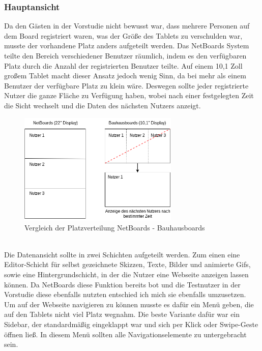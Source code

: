 \subsubsection{Hauptansicht}\label{Hauptansicht}
Da den Gästen in der Vorstudie nicht bewusst war, dass mehrere Personen auf dem Board registriert waren, was der Größe des Tablets zu verschulden war, musste der vorhandene Platz anders aufgeteilt werden. Das NetBoards System teilte den Bereich verschiedener Benutzer räumlich, indem es den verfügbaren Platz durch die Anzahl der registrierten Benutzer teilte.
Auf einem 10,1 Zoll großem Tablet macht dieser Ansatz jedoch wenig Sinn, da bei mehr als einem Benutzer der verfügbare Platz zu klein wäre.
Deswegen sollte jeder registrierte Nutzer die ganze Fläche zu Verfügung haben, wobei nach einer festgelegten Zeit die Sicht wechselt und die Daten des nächsten Nutzers anzeigt.\\
\begin{figure}[h!]
  \centering
    \includegraphics[width=0.68\textwidth]{./img/AufteilungMainView.png}
  \caption{Vergleich der Platzverteilung NetBoards - Bauhausboards}
  \label{img:aufteilungMainView}
\end{figure}
\\
Die Datenansicht sollte in zwei Schichten aufgeteilt werden. Zum einen eine Editor-Schicht für selbst gezeichnete Skizzen, Texte, Bilder und animierte Gifs, sowie eine Hintergrundschicht, in der die Nutzer eine Webseite anzeigen lassen können. Da NetBoards diese Funktion bereits bot und die Testnutzer in der Vorstudie diese ebenfalls nutzten entschied ich mich sie ebenfalls umzusetzen.
\\
Um auf der Webseite navigieren zu können musste es dafür ein Menü geben, die auf den Tablets nicht viel Platz wegnahm. Die beste Variante dafür war ein Sidebar, der standardmäßig eingeklappt war und sich per Klick oder Swipe-Geste öffnen ließ.
In diesem Menü sollten alle Navigationselemente zu untergebracht sein. 
